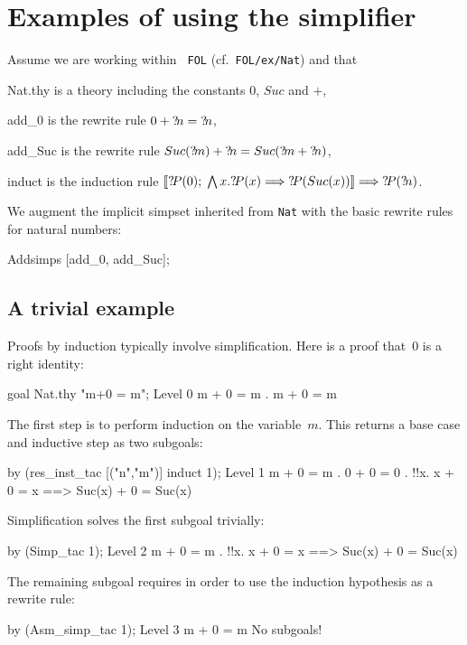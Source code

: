 \section{Examples of using the simplifier}
 Assume we are working within {\tt
  FOL} (cf.\ \texttt{FOL/ex/Nat}) and that
\begin{ttdescription}
\item[Nat.thy] 
  is a theory including the constants $0$, $Suc$ and $+$,
\item[add_0]
  is the rewrite rule $0+{?\!n} = {?\!n}$,
\item[add_Suc]
  is the rewrite rule $Suc({?\!m})+{?\!n} = Suc({?\!m}+{?\!n})$,
\item[induct]
  is the induction rule $\mathopen{[\![}{?\!P}(0);\; \bigwedge x. {?\!P}(x)\Longrightarrow
    {?\!P}(Suc(x))\mathclose{]\!]} \Longrightarrow {?\!P}({?\!n})$.
\end{ttdescription}
We augment the implicit simpset inherited from \texttt{Nat} with the
basic rewrite rules for natural numbers:
\begin{ttbox}
Addsimps [add_0, add_Suc];
\end{ttbox}

\subsection{A trivial example}
Proofs by induction typically involve simplification.  Here is a proof
that~0 is a right identity:
\begin{ttbox}
goal Nat.thy "m+0 = m";
{\out Level 0}
{\out m + 0 = m}
{. m + 0 = m}
\end{ttbox}
The first step is to perform induction on the variable~$m$.  This returns a
base case and inductive step as two subgoals:
\begin{ttbox}
by (res_inst_tac [("n","m")] induct 1);
{\out Level 1}
{\out m + 0 = m}
{. 0 + 0 = 0}
{. !!x. x + 0 = x ==> Suc(x) + 0 = Suc(x)}
\end{ttbox}
Simplification solves the first subgoal trivially:
\begin{ttbox}
by (Simp_tac 1);
{\out Level 2}
{\out m + 0 = m}
{. !!x. x + 0 = x ==> Suc(x) + 0 = Suc(x)}
\end{ttbox}
The remaining subgoal requires  in order to use the
induction hypothesis as a rewrite rule:
\begin{ttbox}
by (Asm_simp_tac 1);
{\out Level 3}
{\out m + 0 = m}
{\out No subgoals!}
\end{ttbox}

